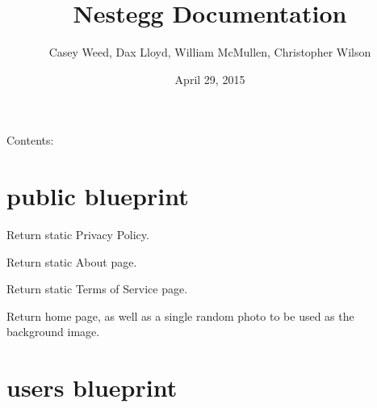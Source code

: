 \documentclass[letterpaper,10pt,english]{sphinxmanual}
\title{Nestegg Documentation}
\date{April 29, 2015}
\author{Casey Weed, Dax Lloyd, William McMullen, Christopher Wilson}
\begin{document}
\maketitle
\tableofcontents
{}\label{index::doc}


Contents:


\chapter{public blueprint}
\label{public:welcome-to-nestegg-s-documentation}\label{public::doc}\label{public:public-blueprint}

\begin{fulllineitems}
\label{public:get--privacy}
Return static Privacy Policy.

\end{fulllineitems}



\begin{fulllineitems}
\label{public:get--about}
Return static About page.

\end{fulllineitems}



\begin{fulllineitems}
\label{public:get--tos}
Return static Terms of Service page.

\end{fulllineitems}



\begin{fulllineitems}
\label{public:get--}
Return home page, as well as a single random photo to be used as the background image.

\end{fulllineitems}



\chapter{users blueprint}
\label{users:users-blueprint}\label{users::doc}
\end{document}
